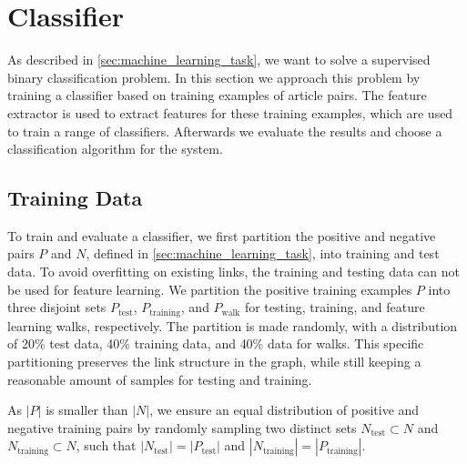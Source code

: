\section{Classifier}\label{sec:classifier}
As described in \cref{sec:machine_learning_task}, we want to solve a supervised binary classification problem. In this section we approach this problem by training a classifier based on training examples of article pairs. The feature extractor is used to extract features for these training examples, which are used to train a range of classifiers. Afterwards we evaluate the results and choose a classification algorithm for the system.

\subsection{Training Data}\label{sec:training_data}
To train and evaluate a classifier, we first partition the positive and negative pairs $P$ and $N$, defined in \cref{sec:machine_learning_task}, into training and test data. To avoid overfitting on existing links, the training and testing data can not be used for feature learning. We partition the positive training examples $P$ into three disjoint sets $P_\text{test}$, $P_\text{training}$, and $P_\text{walk}$ for testing, training, and feature learning walks, respectively. The partition is made randomly, with a distribution of 20\% test data, 40\% training data, and 40\% data for walks. This specific partitioning preserves the link structure in the graph, while still keeping a reasonable amount of samples for testing and training.



As $\left\vert{P}\right\vert$ is smaller than $\left\vert{N}\right\vert$, we ensure an equal distribution of positive and negative training pairs by randomly sampling two distinct sets $N_\text{test} \subset N$ and $N_\text{training} \subset N$, such that $\left\vert{N_\text{test}}\right\vert=\left\vert{P_\text{test}}\right\vert$ and $\left\vert{N_\text{training}}\right\vert=\left\vert{P_\text{training}}\right\vert$.


